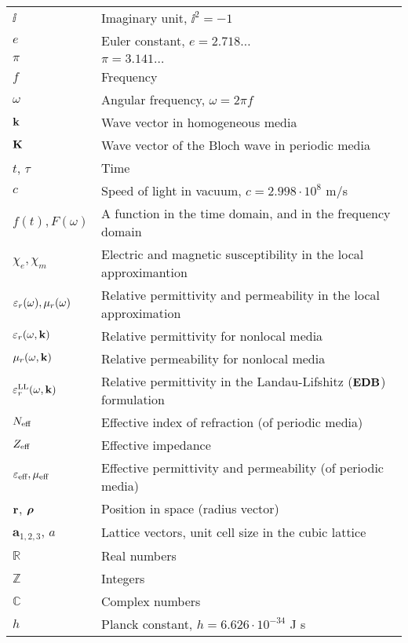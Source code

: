 \begin{table}[ht]
\begin{tabular}{ll}
$\ii$		& Imaginary unit, $\ii^2 = -1$\\
$e$ 		& Euler constant, $e = 2.718\ldots$\\
$\pi$ 		& $\pi = 3.141\ldots$\\
$f$			& Frequency\\
$\omega$ 	& Angular frequency, $\omega = 2\pi f$\\
${\mathbf{k}}$ 		& Wave vector in homogeneous media\\
${\mathbf{K}}$ 		& Wave vector of the Bloch wave in periodic media\\
$t$, $\tau$ 		& Time\\
$c$ 		& Speed of light in vacuum, $c=2.998\cdot 10^8$ m/s \\
$f(t), F(\omega)$ & A function in the time domain, and in the frequency domain \\
$\chi_e,\chi_m$	& Electric and magnetic susceptibility in the local approximantion \\
$\varepsilon_r(\omega), \mu_r(\omega)$ &Relative permittivity and permeability in the local approximation\\
$\varepsilon_r(\omega, {\mathbf{k}})$ &Relative permittivity for nonlocal media\\
$\mu_r(\omega, {\mathbf{k}})$ &Relative permeability for nonlocal media\\
$\varepsilon_r^\text{LL}(\omega, {\mathbf{k}})$ &Relative permittivity in the Landau-Lifshitz ($\mathbf{E}\mathbf{D}\mathbf{B}$) formulation\\
$N_{\text{eff} }$ 	& Effective index of refraction (of periodic media)\\
$Z_{\text{eff} }$ 	& Effective impedance\\
$\varepsilon_{\text{eff} }, \mu_{\text{eff} }$ 	& Effective permittivity and permeability (of periodic media)\\
${\mathbf{r}}$, $\boldsymbol{\rho}$ 		& Position in space (radius vector)\\
$\mathbf{a}_{1,2,3}$, $a$ 		& Lattice vectors, unit cell size in the cubic lattice \\
$\mathbb{R}$		& Real numbers\\
$\mathbb{Z}$		& Integers\\
$\mathbb{C}$		& Complex numbers\\
$h$ 		& Planck constant, $h = 6.626\cdot 10^{-34}$ J s\\

 \bottomrule
 \end{tabular} \end{table}
